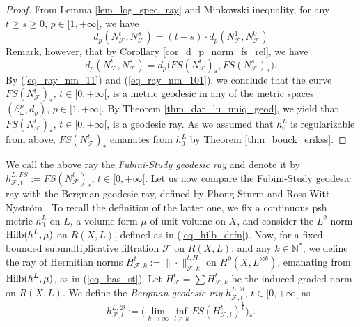 \documentclass[12pt]{article}
\numberwithin{equation}{section}
\theoremstyle{theorem}
\theoremstyle{definition}
\theoremstyle{remark}
\newcommand{\nat}{\mathbb{N}}
\begin{document}
	\begin{proof}
		From Lemma \ref{lem_log_spec_ray} and Minkowski inequality, for any $t \geq s \geq 0$, $p \in [1, +\infty[$, we have
		\begin{equation}\label{eq_ray_nm_11}
			d_p(N_{\mathcal{F}}^t, N_{\mathcal{F}}^s)
			=
			(t - s) 
			\cdot
			d_p(N_{\mathcal{F}}^1, N_{\mathcal{F}}^0)
		\end{equation}
		Remark, however, that by Corollary \ref{cor_d_p_norm_fs_rel}, we have
		\begin{equation}\label{eq_ray_nm_101}
			d_p(N_{\mathcal{F}}^t, N_{\mathcal{F}}^s)
			=
			d_p \big( FS(N^t_{\mathcal{F}})_*, FS(N^s_{\mathcal{F}})_* \big).
		\end{equation}
		By (\ref{eq_ray_nm_11}) and (\ref{eq_ray_nm_101}), we conclude that the curve $FS(N^t_{\mathcal{F}})_*$, $t \in [0, +\infty[$, is a metric geodesic in any of the metric spaces $(\mathcal{E}_{\omega}^p, d_p)$, $p \in [1, +\infty[$.
		By Theorem \ref{thm_dar_lu_uniq_geod}, we yield that $FS(N^t_{\mathcal{F}})_*$, $t \in [0, +\infty[$, is a geodesic ray.
		As we assumed that $h^L_0$ is regularizable from above, $FS(N^t_{\mathcal{F}})_*$ emanates from $h^L_0$ by Theorem \ref{thm_bouck_erikss}.
	\end{proof}
	We call the above ray the \textit{Fubini-Study geodesic ray} and denote it by $h^{L, FS}_{\mathcal{F}, t} := FS(N^t_{\mathcal{F}})_*$, $t \in [0, +\infty[$.
	Let us now compare the Fubini-Study geodesic ray with the Bergman geodesic ray, defined by Phong-Sturm \cite{PhongSturmTestGeodK} and Ross-Witt Nystr{\"o}m \cite{RossNystAnalTConf}.
	To recall the definition of the latter one, we fix a continuous psh metric $h^L_0$ on $L$, a volume form $\mu$ of unit volume on $X$, and consider the $L^2$-norm ${\rm{Hilb}}(h^L, \mu)$ on $R(X, L)$, defined as in (\ref{eq_hilb_defn}).
	Now, for a fixed bounded submultiplicative filtration $\mathcal{F}$ on $R(X, L)$, and any $k \in \nat^*$, we define the ray of Hermitian norms $H^t_{\mathcal{F}, k} := \| \cdot \|^{t, H}_{\mathcal{F}, k}$ on $H^0(X, L^{\otimes k})$, emanating from ${\rm{Hilb}}(h^L, \mu)$, as in (\ref{eq_bas_st}).
	Let $H^t_{\mathcal{F}} = \sum H^t_{\mathcal{F}, k}$ be the induced graded norm on $R(X, L)$.
	We define the \textit{Bergman geodesic ray} $h^{L, \mathcal{B}}_{\mathcal{F}, t}$, $t \in [0, +\infty[$ as
	\begin{equation}\label{defn_ray_geod_bergm}
		h^{L, \mathcal{B}}_{\mathcal{F}, t} := \big( \lim_{k \to \infty} \inf_{l \geq k} FS(H^t_{\mathcal{F}, l})^{\frac{1}{l}} \big)_*.
	\end{equation}
\end{document}
